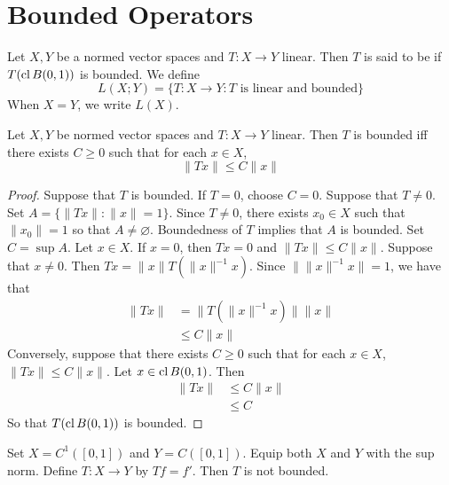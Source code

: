 \documentclass{book}
\begin{document}
	
	
	
	
	
	
	
	
	
	
	
	
	\newpage
	\section{Bounded Operators}
	
	\begin{defn}  
		Let $X,Y$ be a normed vector spaces and $T:X \rightarrow Y$ linear. Then $T$ is said to be  if $T(\operatorname{cl} B(0,1))$ is bounded. We define $$L(X; Y) = \{T:X \rightarrow Y: T \text{ is linear and bounded}\}$$
		When $X=Y$, we write $L(X)$.
	\end{defn}
	
	\begin{ex}  
		Let $X,Y$ be normed vector spaces and $T:X \rightarrow Y$ linear. Then $T$ is bounded iff there exists $C \geq 0$ such that for each $x \in X$, $$\|Tx \|\leq C \|x \|$$ 
	\end{ex}
	
	\begin{proof}
	Suppose that $T$ is bounded. If $T = 0$, choose $C = 0$. Suppose that $T \neq 0$. Set $ A = \{\|Tx\|: \|x\| =1\}$. Since $T \neq 0$, there exists $x_0 \in X$ such that $\|x_0\| = 1$ so that $A \neq \varnothing$.  Boundedness of $T$ implies that $A$ is bounded. Set $C = \sup A$. Let $x \in X$. If $x = 0$, then $Tx = 0$ and $\|Tx\| \leq C \|x\|$. Suppose that $x \neq 0$. Then $Tx = \|x\| T(\|x\|^{-1} x)$. Since $\|\|x\|^{-1} x\| = 1$, we have that
	\begin{align*}
	\|Tx\|
	&= \|T(\|x\|^{-1} x)\| \|x\|  \\
	& \leq C\|x\| 
\end{align*}	
Conversely, suppose that there exists $C \geq 0$ such that for each $x \in X$, $\|Tx \|\leq C \|x \|$. Let $x \in \operatorname{cl} B(0,1)$. Then 
	\begin{align*}
	\|Tx\| 
	&\leq C \|x\| \\
	&\leq C
	\end{align*}
So that $T(\operatorname{cl} B(0,1))$ is bounded. 
	\end{proof}
	
	\begin{ex} 
	Set $X = C^{1}([0,1])$ and $Y = C([0,1])$. Equip both $X$ and $Y$ with the sup norm. Define $T:X \rightarrow Y$ by $Tf = f'$. Then $T$ is not bounded.
	\end{ex}
	
\end{document}
